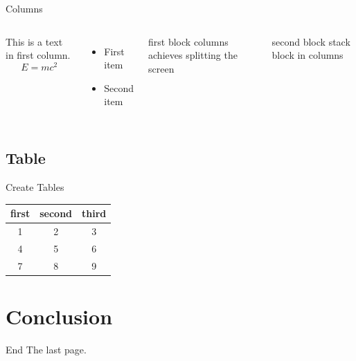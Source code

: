 \begin{frame}{Columns}
    \begin{columns}
        This is a text in first column.
        $$E=mc^2$$
        \begin{itemize}
        \item First item
        \item Second item
        \end{itemize}
        
        \begin{block}{first block}
            columns achieves splitting the screen
        \end{block}
        \begin{block}{second block}
            stack block in columns
        \end{block}
        
    \end{columns}
\end{frame}

\subsection{Table}


\begin{frame}{Create Tables}
    \begin{center}
        \begin{table}[!t]  
            \begin{tabular}{ccc}  
                \toprule   
                first&second&third\\ 
                \midrule       
                1 & 2 & 3 \\ 
                4 & 5 & 6 \\ 
                7 & 8 & 9 \\
                \bottomrule  
            \end{tabular}
        \end{table}
    \end{center}
\end{frame}



\section{Conclusion}

\begin{frame}{End}
    The last page.
\end{frame}